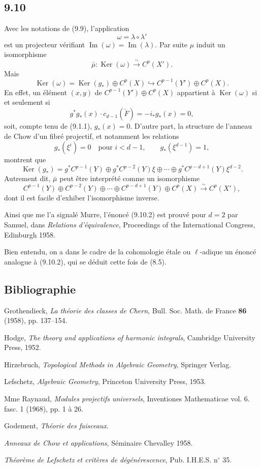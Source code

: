 \documentclass[11pt]{article}
\providecommand{\Ker}{\operatorname{Ker}}
\providecommand{\Ker}{\operatorname{Ker}}
\providecommand{\Ker}{\operatorname{Ker}}
\begin{document}
\subsection*{9.10}

Avec les notations de (9.9), l'application
\[
\omega=\lambda\circ\lambda'
\]
est un projecteur vérifiant $\operatorname{Im}(\omega)=\operatorname{Im}(\lambda)$. Par suite $\mu$ induit un isomorphisme
\[
\bar\mu:\Ker(\omega)\xrightarrow{\sim}C^p(X').
\]
Mais
\[
\Ker(\omega)=\Ker(g_*)\oplus C^p(X)\hookrightarrow C^{p-1}(Y')\oplus C^p(X).
\tag{9.10.1}
\]
En effet, un élément $(x,y)$ de $C^{p-1}(Y')\oplus C^p(X)$ appartient à $\Ker(\omega)$ si et seulement si
\[
g^*g_*(x)\cdot c_{d-1}(\check F)=-i_*g_*(x)=0,
\]
soit, compte tenu de (9.1.1), $g_*(x)=0$. D'autre part, la structure de l'anneau de Chow d'un fibré projectif, et notamment les relations
\[
g_*(\xi^i)=0\quad\text{pour }i<d-1,\qquad g_*(\xi^{d-1})=1,
\]
montrent que
\[
\Ker(g_*)=g^*C^{p-1}(Y)\oplus g^*C^{p-2}(Y)\xi\oplus\cdots\oplus g^*C^{p-d+1}(Y)\xi^{d-2}.
\]
Autrement dit, $\bar\mu$ peut être interprété comme un isomorphisme
\[
C^{p-1}(Y)\oplus C^{p-2}(Y)\oplus\cdots\oplus C^{p-d+1}(Y)\oplus C^p(X)
\xrightarrow{\sim}C^p(X'),
\tag{9.10.2}
\]
dont il est facile d'exhiber l'isomorphisme inverse.

Ainsi que me l'a signalé Murre, l'énoncé (9.10.2) est prouvé pour $d=2$ par Samuel, dans \emph{Relations d'équivalence}, Proceedings of the International Congress, Edinburgh 1958.

Bien entendu, on a dans le cadre de la cohomologie étale ou $\ell$-adique un énoncé analogue à (9.10.2), qui se déduit cette fois de (8.5).

\subsection*{Bibliographie}

\begin{enumerate}[label={[\arabic*]}]
\item Grothendieck, \emph{La théorie des classes de Chern}, Bull. Soc. Math. de France \textbf{86} (1958), pp. 137--154.
\item Hodge, \emph{The theory and applications of harmonic integrals}, Cambridge University Press, 1952.
\item Hirzebruch, \emph{Topological Methods in Algebraic Geometry}, Springer Verlag.
\item Lefschetz, \emph{Algebraic Geometry}, Princeton University Press, 1953.
\item Mme Raynaud, \emph{Modules projectifs universels}, Inventiones Mathematicae vol. 6. fasc. 1 (1968), pp. 1 à 26.
\item[{[TF]}] Godement, \emph{Théorie des faisceaux}.
\item[{[CH]}] \emph{Anneaux de Chow et applications}, Séminaire Chevalley 1958.
\item[{[6]}] \emph{Théorème de Lefschetz et critères de dégénérescence}, Pub. I.H.E.S. n$^\circ$ 35.
\end{enumerate}
\end{document}
